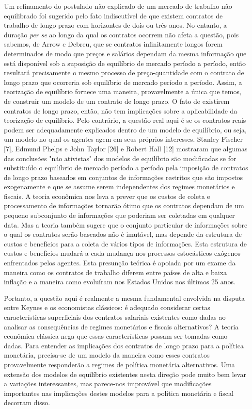 \documentclass[12pt]{article}
\begin{document}
Um refinamento do postulado não explicado de um mercado de trabalho não equilibrado foi sugerido pelo fato indiscutível de que existem contratos de trabalho de longo prazo com horizontes de dois ou três anos. No entanto, a duração \textit{per se} ao longo da qual os contratos ocorrem não afeta a questão, pois sabemos, de Arrow e Debreu, que se contratos infinitamente longos forem determinados de modo que preços e salários dependam da mesma informação que está disponível sob a suposição de equilíbrio de mercado período a período, então resultará precisamente o mesmo processo de preço-quantidade com o contrato de longo prazo que ocorreria sob equilíbrio de mercado período a período. Assim, a teorização de equilíbrio fornece uma maneira, provavelmente a única que temos, de construir um modelo de um contrato de longo prazo. O fato de existirem contratos de longo prazo, então, não tem implicações sobre a aplicabilidade da teorização de equilíbrio. Pelo contrário, a questão real aqui é se os contratos reais podem ser adequadamente explicados dentro de um modelo de equilíbrio, ou seja, um modelo no qual os agentes agem em seus próprios interesses. Stanley Fischer [7], Edmund Phelps e John Taylor [26] e Robert Hall [12] mostraram que algumas das conclusões "não ativistas" dos modelos de equilíbrio são modificadas se for substituído o equilíbrio de mercado período a período pela imposição de contratos de longo prazo baseados em conjuntos de informações restritos que são impostos exogenamente e que se assume serem independentes dos regimes monetários e fiscais. A teoria econômica nos leva a prever que os custos de coleta e processamento de informações tornarão ótimo que os contratos dependam de um pequeno subconjunto de informações que poderiam ser coletadas em qualquer data. Mas a teoria também sugere que o conjunto particular de informações sobre o qual os contratos serão baseados não é imutável, mas depende da estrutura de custos e benefícios para a coleta de vários tipos de informações. Esta estrutura de custos e benefícios mudará a cada mudança nos processos estocásticos exógenos enfrentados pelos agentes. Esta presunção teórica é apoiada por um exame da maneira como os contratos de trabalho diferem entre países de alta e baixa inflação e a maneira como evoluíram nos Estados Unidos nos últimos 25 anos.

Portanto, a questão aqui é realmente a mesma fundamental envolvida na disputa entre Keynes e os economistas clássicos: é adequado considerar certas características superficiais dos contratos salariais existentes como dadas ao analisar as consequências de regimes monetários e fiscais alternativos? A teoria econômica clássica nega que essas características possam ser tomadas como dadas. Para entender as implicações dos contratos de longo prazo para a política monetária, precisa-se de um modelo da maneira como esses contratos provavelmente responderão a regimes de política monetária alternativos. Uma extensão dos modelos de equilíbrio existentes nesta direção pode muito bem levar a variações interessantes, mas parece-nos improvável que modificações importantes nas implicações destes modelos para a política monetária e fiscal decorram disso.
\end{document}
